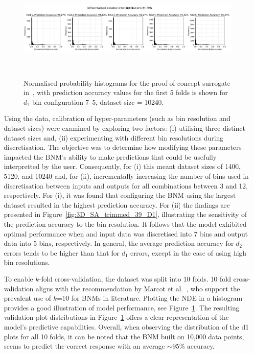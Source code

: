 \documentclass[journal]{IEEEtran}
\begin{document}
\begin{figure}[t]
    \centering
    \includegraphics[width=\textwidth]{figures/validation_plots/PROCESS/st20_d1_7bins_folds.png}
    \caption{\small Normalised probability histograms for the proof-of-concept surrogate in~\cite{Griffiths2024}, with prediction accuracy values for the first 5 folds is shown for $d_{1}$ bin configuration 7--5, dataset size = 10240.}~\label{fig:k-foldhistograms}
\end{figure}


Using the data, calibration of hyper-parameters (such as bin resolution and dataset sizes) were examined by exploring two factors: (i) utilising three distinct dataset sizes and, (ii) experimenting with different bin resolutions during discretisation. The objective was to determine how modifying these parameters impacted the BNM's ability to make predictions that could be usefully interpretted by the user. Consequently, for (i) this meant dataset sizes of 1400, 5120, and 10240 and, for (ii), incrementally increasing the number of bins used in discretisation between inputs and outputs for all combinations between 3 and 12, respectively. For (i), it was found that configuring the BNM using the largest dataset resulted in the highest prediction accuracy. For (ii) the findings are presented in Figure~\ref{fig:3D_SA_trimmed_39_D1}, illustrating the sensitivity of the prediction accuracy to the bin resolution. It follows that the model exhibited optimal performance when and input data was discretised into 7 bins and output data into 5 bins, respectively. In general, the average prediction accuracy for $d_{2}$ errors tends to be higher than that for $d_{1}$ errors, except in the case of using high bin resolutions.

To enable $k$-fold cross-validation, the dataset was split into 10 folds. 10 fold cross-validation aligns with the recommendation by Marcot et al.~\cite{Marcot2021}, who support the prevalent use of $k$=10 for BNMs in literature. Plotting the NDE in a histogram provides a good illustration of model performance, see Figure~\ref{fig:k-foldhistograms}. The resulting validation plot distributions in Figure~\ref{fig:k-foldhistograms} offers a clear representation of the model's predictive capabilities. Overall, when observing the distribution of the d1 plots for all 10 folds, it can be noted that the BNM built on 10,000 data points, seems to predict the correct response with an average $\sim$95\% accuracy.
\end{document}

